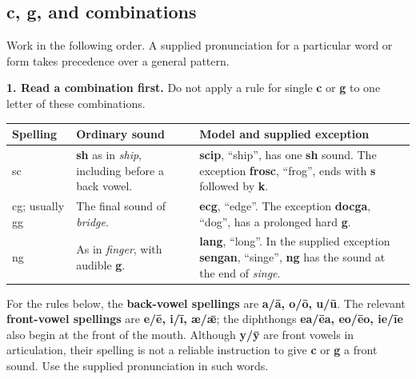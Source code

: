 \subsection*{c, g, and combinations}

Work in the following order. A supplied pronunciation for a particular word or form takes precedence over a general pattern.

\textbf{1. Read a combination first.} Do not apply a rule for single \textbf{c} or \textbf{g} to one letter of these combinations.

\par\begingroup
\fontsize{10.5}{13.2}\selectfont
\setlength{\LTleft}{0pt}\setlength{\LTright}{\fill}
\noindent
\begin{tabular}{@{}>{\raggedright\arraybackslash}p{15.233mm}>{\raggedright\arraybackslash}p{35.876mm}>{\raggedright\arraybackslash}p{67.267mm}@{}}
\toprule
\textbf{Spelling} & \textbf{Ordinary sound} & \textbf{Model and supplied exception} \\
\midrule
sc & \textbf{sh} as in \emph{ship}, including before a back vowel. & \textbf{scip}, “ship”, has one \textbf{sh} sound. The exception \textbf{frosc}, “frog”, ends with \textbf{s} followed by \textbf{k}. \\
cg; usually gg & The final sound of \emph{bridge}. & \textbf{ecg}, “edge”. The exception \textbf{docga}, “dog”, has a prolonged hard \textbf{g}. \\
ng & As in \emph{finger}, with audible \textbf{g}. & \textbf{lang}, “long”. In the supplied exception \textbf{sengan}, “singe”, \textbf{ng} has the sound at the end of \emph{singe}. \\
\bottomrule
\end{tabular}
\par\endgroup

For the rules below, the \textbf{back-vowel spellings} are \textbf{a/\allowbreak{}ā, o/\allowbreak{}ō, u/\allowbreak{}ū}. The relevant \textbf{front-vowel spellings} are \textbf{e/\allowbreak{}ē, i/\allowbreak{}ī, æ/\allowbreak{}ǣ}; the diphthongs \textbf{ea/\allowbreak{}ēa, eo/\allowbreak{}ēo, ie/\allowbreak{}īe} also begin at the front of the mouth. Although \textbf{y/\allowbreak{}ȳ} are front vowels in articulation, their spelling is not a reliable instruction to give \textbf{c} or \textbf{g} a front sound. Use the supplied pronunciation in such words.


